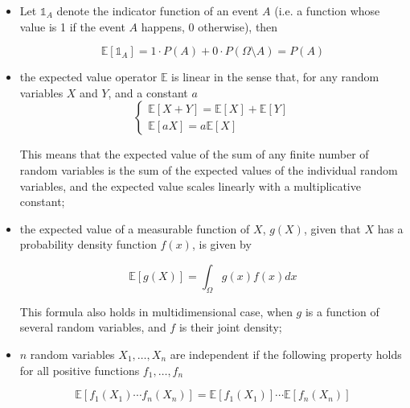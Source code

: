 \begin{itemize}
\tightlist
\item Let $\mathbb{1}_{A}$ denote the indicator function of an event $A$ (i.e. a function whose value is 1 if the event $A$ happens, 0 otherwise), then

\begin{equation}
\mathbb{E}[\mathbb{1}_{A}] = 1\cdot P(A)+0\cdot P(\Omega \setminus A)= P(A)
\end{equation}

\item the expected value operator \(\mathbb{E}\) is linear in the sense that, for any random variables $X$ and $Y$, and a constant $a$
\begin{equation}
\begin{cases}
\mathbb{E}[X+Y] = \mathbb{E}[X] + \mathbb{E}[Y] \\
\mathbb{E}[aX] = a\mathbb{E}[X]
\end{cases}
\end{equation}

This means that the expected value of the sum of any finite number of random variables is the sum of the expected values of the individual random variables, and the expected value scales linearly with a multiplicative constant;

\item the expected value of a measurable function of $X$, $g(X)$, given that $X$ has a probability density function $f(x)$, is given by 

\begin{equation}
\mathbb{E}[g(X)] = \int_{\Omega}g(x)f(x) dx
\end{equation}

This formula also holds in multidimensional case, when $g$ is a function of several random variables, and $f$ is their joint density;

\item $n$ random variables $X_1 ,\ldots , X_n$ are independent if the following property holds for all positive functions $f_1 ,\ldots , f_n$

\begin{equation}
\mathbb{E}[f_1 (X_1 )\cdots f_n (X_n )] = \mathbb{E}[f_1 ( X_1 )] \cdots \mathbb{E}[f_n (X_n )]
\end{equation}
\end{itemize}


%


